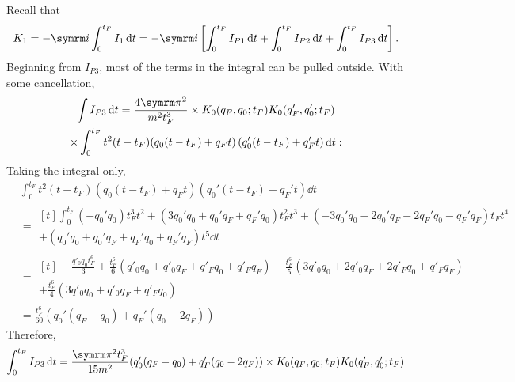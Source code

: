 Recall that
\begin{equation}
    K_1 = -\im\int_0^{t_F} I_1\dd{t} = -\im\left[\int_0^{t_F} I_{P1}\dd{t} + \int_0^{t_F} I_{P2}\dd{t} + \int_0^{t_F} I_{P3}\dd{t}\right].
\end{equation}
Beginning from $I_{P3}$, most of the terms in the integral can be pulled outside. With some cancellation,
\begin{multline}
    \int I_{P3}\dd{t} =
        \frac{4\cpi^2}{m^2t_F^3} \times K_0(q_F, q_0; t_F)K_0(q_F', q_0'; t_F) \\
        \times\int_0^{t_F} t^2 (t - t_F){\left(q_0(t - t_F) + q_Ft\right)\left(q_0'(t - t_F) + q_F't\right)} \dd{t}:
\end{multline}
Taking the integral only,
\begin{align}
    &\int_0^{t_F} t^2 (t - t_F){\left(q_0(t - t_F) + q_Ft\right)\left(q_0'(t - t_F) + q_F't\right)} \dd{t} \\
    &= \begin{multlined}[t]
        \int_0^{t_F} (-q_0'q_0)t_F^3t^2 + (3q_0'q_0 + q_0'q_F + q_F'q_0)t_F^2t^3 + (-3q_0'q_0 - 2q_0'q_F - 2q_F'q_0 - q_F'q_F)t_Ft^4 \\
        + (q_0'q_0 + q_0'q_F + q_F'q_0 + q_F'q_F)t^5 \dd{t}
    \end{multlined} \\
    &= \begin{multlined}[t]
        - \frac{q'_{0} q_{0} t_{F}^{6}}{3} + \frac{t_{F}^{6}}{6} \left({q'_{0} q_{0}} + {q'_{0} q_{F}} + {q'_{F} q_{0}} + {q'_{F} q_{F}}\right) - \frac{t_{F}^{6}}{5} \left(3 q'_{0} q_{0} + 2 q'_{0} q_{F} + 2 q'_{F} q_{0} + q'_{F} q_{F}\right)\\ + \frac{t_{F}^{6}}{4}\left(3 q'_{0} q_{0} + q'_{0} q_{F} + q'_{F} q_{0}\right)
    \end{multlined} \\
    &= \frac{t_F^6}{60}(q_0'(q_F - q_0) + q_F'(q_0 - 2q_F)) \label{eq:spring_1storder_intIP3}
\end{align}
Therefore,
\begin{equation}
    \int_0^{t_F}I_{P3}\dd{t} = \frac{\cpi^2t_F^3}{15m^2}(q_0'(q_F - q_0) + q_F'(q_0 - 2q_F)) \times K_0(q_F, q_0; t_F)K_0(q_F', q_0'; t_F)
\end{equation}


